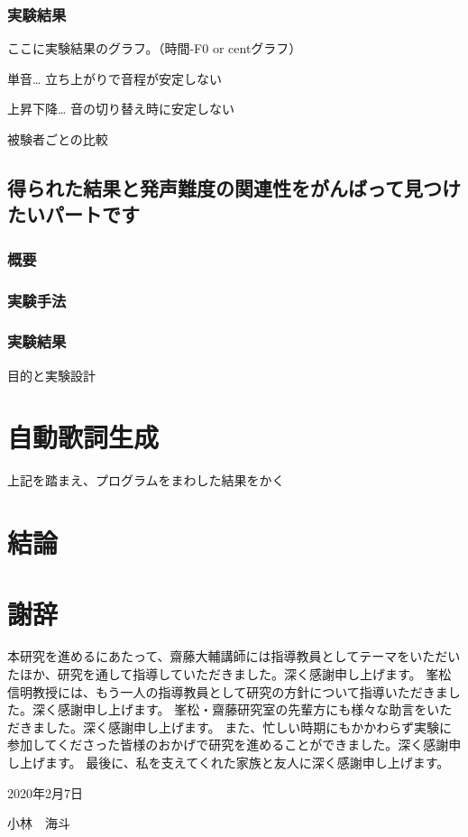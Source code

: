 \documentclass[10ptj,a4j,dvipdfmx,uplatex, draft]{jsbook}%
\begin{document}
\subsection{実験結果}
ここに実験結果のグラフ。（時間-F0 or centグラフ）


単音…
立ち上がりで音程が安定しない

上昇下降…
音の切り替え時に安定しない

被験者ごとの比較

\section{得られた結果と発声難度の関連性をがんばって見つけたいパートです}
\subsection{概要}
\subsection{実験手法}
\subsection{実験結果}

目的と実験設計



\chapter{自動歌詞生成}
上記を踏まえ、プログラムをまわした結果をかく


\chapter{結論}


\chapter{謝辞}
本研究を進めるにあたって、齋藤大輔講師には指導教員としてテーマをいただいたほか、研究を通して指導していただきました。深く感謝申し上げます。
峯松信明教授には、もう一人の指導教員として研究の方針について指導いただきました。深く感謝申し上げます。
峯松・齋藤研究室の先輩方にも様々な助言をいただきました。深く感謝申し上げます。
また、忙しい時期にもかかわらず実験に参加してくださった皆様のおかげで研究を進めることができました。深く感謝申し上げます。
最後に、私を支えてくれた家族と友人に深く感謝申し上げます。

\begin{flushright}
2020年2月7日

小林　海斗
\end{flushright}


\end{document}
